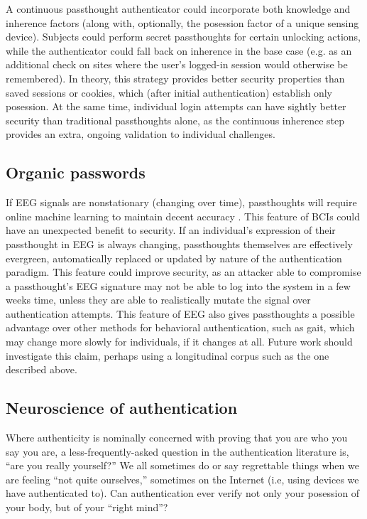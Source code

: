 \documentclass[sigconf]{acmart}
\begin{document}
A continuous passthought authenticator could incorporate both knowledge and inherence factors (along with, optionally, the posession factor of a unique sensing device).
Subjects could perform secret passthoughts for certain unlocking actions,
while the authenticator could fall back on inherence in the base case (e.g. as an additional check on sites where the user's logged-in session would otherwise be remembered).
In theory, this strategy provides better security properties than saved sessions or cookies, which (after initial authentication) establish only posession. At the same time, individual login attempts can have sightly better security than traditional passthoughts alone, as the continuous inherence step provides an extra, ongoing validation to individual challenges.

\subsection{Organic passwords}
\label{sec:org4b5fad6}

If EEG signals are nonstationary (changing over time), passthoughts will require online machine learning to maintain decent accuracy \cite{Vidaurre2006a}.
This feature of BCIs could have an unexpected benefit to security. 
If an individual's expression of their passthought in EEG is always changing, 
passthoughts themselves are effectively evergreen, automatically replaced or updated by nature of the authentication paradigm.
This feature could improve security, as an attacker able to compromise a passthought's EEG signature may not be able to log into the system in a few weeks time,
unless they are able to realistically mutate the signal over authentication attempts.
This feature of EEG also gives passthoughts a possible advantage over other methods for behavioral authentication, such as gait, which may change more slowly for individuals, if it changes at all.
Future work should investigate this claim, perhaps using a longitudinal corpus such as the one described above.
\subsection{Neuroscience of authentication}
\label{sec:orgeb5bc64}

Where authenticity is nominally concerned with proving that you are who you say you are,
a less-frequently-asked question in the authentication literature is,
``are you really yourself?''
We all sometimes do or say regrettable things when we are feeling ``not quite ourselves,'' sometimes on the Internet (i.e, using devices we have authenticated to).
Can authentication ever verify not only your posession of your body, but of your ``right mind''?
\end{document}
